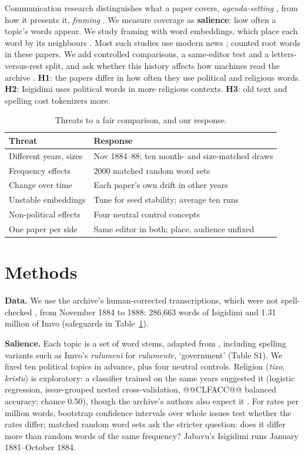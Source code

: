 \documentclass[10pt,letterpaper]{article}
\begin{document}
Communication research distinguishes what a paper covers, \emph{agenda-setting} \citep{mccombs1972}, from how it presents it, \emph{framing} \citep{entman1993}. We measure coverage as \textbf{salience}: how often a topic's words appear. We study framing with word embeddings, which place each word by its neighbours \citep{hamilton2016}. Most such studies use modern news \citep{card2015,field2018}; \citet{schoots2023b} counted root words in these papers. We add controlled comparisons, a same-editor test and a letters-versus-rest split, and ask whether this history affects how machines read the archive \citep{petrov2023,rust2021}. \textbf{H1}: the papers differ in how often they use political and religious words. \textbf{H2}: Isigidimi uses political words in more religious contexts. \textbf{H3}: old text and spelling cost tokenizers more.

\begin{table}[t]
\centering\footnotesize
\begin{tabular}{@{}p{1.18in}p{2.02in}@{}}
\toprule
\textbf{Threat} & \textbf{Response} \\ \midrule
Different years, sizes & Nov 1884--88; ten month- and size-matched draws \\
Frequency effects & 2000 matched random word sets \citep{monroe2008} \\
Change over time & Each paper's own drift in other years \\
Unstable embeddings & Tune for seed stability; average ten runs \\
Non-political effects & Four neutral control concepts \\
One paper per side & Same editor in both; place, audience unfixed \\
\bottomrule
\end{tabular}
\caption{Threats to a fair comparison, and our response.}
\label{tab:design}
\end{table}

\section{Methods}
\textbf{Data.} We use the archive's human-corrected transcriptions, which were not spell-checked \citep[p.~59]{schoots2023}, from November 1884 to 1888: 286{,}663 words of Isigidimi and 1.31 million of Imvo (safeguards in Table~\ref{tab:design}).

\textbf{Salience.} Each topic is a set of word stems, adapted from \citet{schoots2023b}, including spelling variants such as Imvo's \emph{rulumeni} for \emph{rulumente}, `government' (Table S1). We fixed ten political topics in advance, plus four neutral controls. Religion (\emph{tixo}, \emph{kristu}) is exploratory: a classifier trained on the same years suggested it (logistic regression, issue-grouped nested cross-validation, @@CLFACC@@ balanced accuracy; chance 0.50), though the archive's authors also expect it \citep[p.~57]{schoots2023}. For rates per million words, bootstrap confidence intervals over whole issues test whether the rates differ; matched random word sets ask the stricter question: does it differ more than random words of the same frequency? Jabavu's Isigidimi runs January 1881--October 1884.
\end{document}
